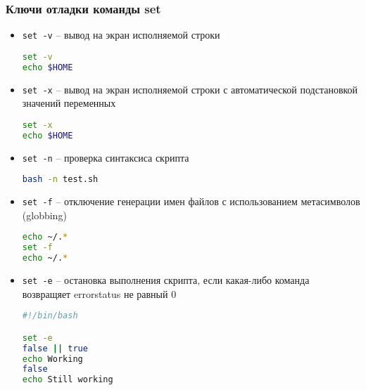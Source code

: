 \begin{frame}
	\frametitle{Ключи отладки команды set}

	\begin{itemize}
		\item {\tt set -v} -- вывод на экран исполняемой строки
			\begin{lstlisting}[language=sh]
set -v
echo $HOME
			\end{lstlisting}

		\item {\tt set -x} -- вывод на экран исполняемой строки с автоматической подстановкой значений переменных
\begin{lstlisting}[language=sh]
set -x
echo $HOME
\end{lstlisting}

		\item {\tt set -n} -- проверка синтаксиса скрипта
\begin{lstlisting}[language=sh]
bash -n test.sh
\end{lstlisting} 


		\item {\tt set -f} -- отключение генерации имен файлов с использованием метасимволов (globbing)
\begin{lstlisting}[language=sh]
echo ~/.*
set -f
echo ~/.*
\end{lstlisting} 
		\framebreak
		\item {\tt set -e} -- остановка выполнения скрипта, если какая-либо команда 
		возвращяет errorstatus не равный 0
			\begin{lstlisting}[language=sh]
#!/bin/bash

set -e
false || true
echo Working
false
echo Still working
			\end{lstlisting} 
	\end{itemize}
\end{frame}
